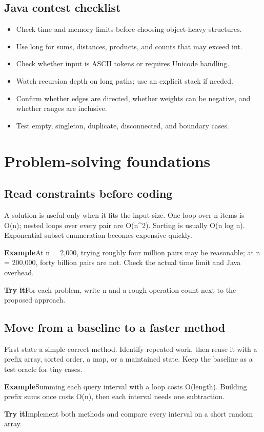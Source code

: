 \documentclass[10pt,letterpaper]{article}
\newcommand{\entrylabel}[1]{\textcolor{accent}{\bfseries #1}}
\begin{document}
\subsection*{Java contest checklist}
\begin{guidebox}\begin{itemize}
\item Check time and memory limits before choosing object-heavy structures.
\item Use long for sums, distances, products, and counts that may exceed int.
\item Check whether input is ASCII tokens or requires Unicode handling.
\item Watch recursion depth on long paths; use an explicit stack if needed.
\item Confirm whether edges are directed, whether weights can be negative, and whether ranges are inclusive.
\item Test empty, singleton, duplicate, disconnected, and boundary cases.
\end{itemize}\end{guidebox}
\section*{Problem-solving foundations}
\subsection*{Read constraints before coding}
A solution is useful only when it fits the input size. One loop over n items is O(n); nested loops over every pair are O(n\textasciicircum{}2). Sorting is usually O(n log n). Exponential subset enumeration becomes expensive quickly.\par
\begin{guidebox}\entrylabel{Example}\quad At n = 2,000, trying roughly four million pairs may be reasonable; at n = 200,000, forty billion pairs are not. Check the actual time limit and Java overhead.\par
\entrylabel{Try it}\quad For each problem, write n and a rough operation count next to the proposed approach.\end{guidebox}
\subsection*{Move from a baseline to a faster method}
First state a simple correct method. Identify repeated work, then reuse it with a prefix array, sorted order, a map, or a maintained state. Keep the baseline as a test oracle for tiny cases.\par
\begin{guidebox}\entrylabel{Example}\quad Summing each query interval with a loop costs O(length). Building prefix sums once costs O(n), then each interval needs one subtraction.\par
\entrylabel{Try it}\quad Implement both methods and compare every interval on a short random array.\end{guidebox}
\end{document}
